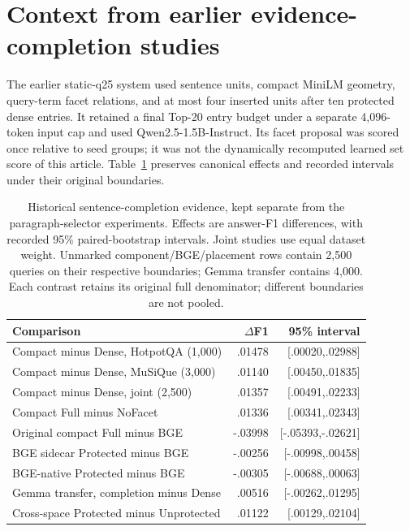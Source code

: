 \documentclass[pdflatex,sn-mathphys-num]{sn-jnl}
\begin{document}
\section{Context from earlier evidence-completion studies}\label{sec:history}
The earlier static-q25 system used sentence units, compact MiniLM geometry,
query-term facet relations, and at most four inserted units after ten
protected dense entries. It retained a final Top-20 entry budget under a
separate 4,096-token input cap and used Qwen2.5-1.5B-Instruct. Its facet
proposal was scored once relative to seed groups; it was not the dynamically
recomputed learned set score of this article. Table~\ref{tab:history}
preserves canonical effects and recorded intervals under their original
boundaries.

\begin{table}[t]\centering\small
\caption{Historical sentence-completion evidence, kept separate from the
paragraph-selector experiments. Effects are answer-F1 differences, with
recorded 95\% paired-bootstrap intervals. Joint studies use equal dataset
weight. Unmarked component/BGE/placement rows contain 2,500 queries on their
respective boundaries; Gemma transfer contains 4,000. Each contrast retains
its original full denominator; different boundaries are not pooled.}
\label{tab:history}
\begin{tabular}{p{.52\linewidth}rr}\toprule
Comparison & $\Delta$F1 & 95\% interval\\\midrule
Compact minus Dense, HotpotQA (1,000) & .01478 & [.00020,.02988]\\
Compact minus Dense, MuSiQue (3,000) & .01140 & [.00450,.01835]\\
Compact minus Dense, joint (2,500) & .01357 & [.00491,.02233]\\
Compact Full minus NoFacet & .01336 & [.00341,.02343]\\
Original compact Full minus BGE & -.03998 & [-.05393,-.02621]\\
BGE sidecar Protected minus BGE & -.00256 & [-.00998,.00458]\\
BGE-native Protected minus BGE & -.00305 & [-.00688,.00063]\\
Gemma transfer, completion minus Dense & .00516 & [-.00262,.01295]\\
Cross-space Protected minus Unprotected & .01122 & [.00129,.02104]\\\bottomrule
\end{tabular}
\end{table}
\end{document}

